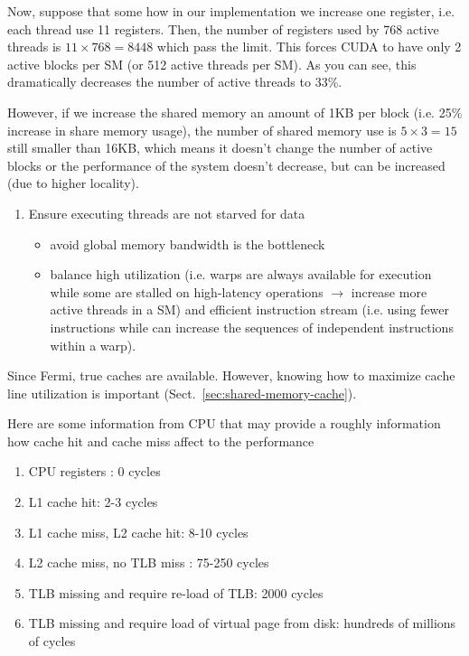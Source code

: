 Now, suppose that some how in our implementation we increase one
register, i.e. each thread use 11 registers. Then, the number of
registers used by 768 active threads is $11\times 768 = 8448$ which
pass the limit. This forces CUDA to have only 2 active blocks per SM
(or 512 active threads per SM). As you can see, this dramatically
decreases the number of active threads to 33\%. 

However, if we increase the shared memory an amount of 1KB per block
(i.e. 25\% increase in share memory usage), the number of shared
memory use is $5\times 3 = 15$ still smaller than 16KB, which means it
doesn't change the number of active blocks or the performance of the
system doesn't decrease, but can be increased (due to higher
locality).

\begin{enumerate}
\item Ensure executing threads are not starved for data
  \begin{itemize}
  \item avoid global memory bandwidth is the bottleneck
  \item balance high utilization (i.e. warps are always available for
    execution while some are stalled on high-latency operations
    $\rightarrow$ increase more active threads in a SM) and efficient
    instruction stream (i.e. using fewer instructions while can
    increase the sequences of independent instructions within a
    warp). 
  \end{itemize}
\end{enumerate}

Since Fermi, true caches are available. However, knowing how to
maximize cache line utilization is important
(Sect.~\ref{sec:shared-memory-cache}). 

\begin{framed}
  Here are some information from CPU that may provide a roughly
  information how cache hit and cache miss affect to the performance
  \begin{enumerate}
  \item CPU registers : 0 cycles
  \item L1 cache hit: 2-3 cycles
  \item L1 cache miss, L2 cache hit: 8-10 cycles
  \item L2 cache miss, no TLB miss : 75-250 cycles
  \item TLB missing and require re-load of TLB: 2000 cycles
  \item TLB missing and require load of virtual page from disk:
    hundreds of millions of cycles
  \end{enumerate}
\end{framed}

